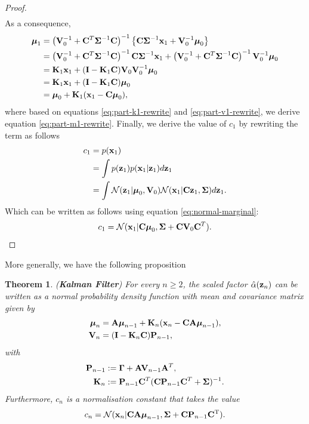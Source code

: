 \documentclass[12pt, oneside]{book}
\numberwithin{equation}{section}
\newcommand{\x}{{\bf x}}
\newcommand{\z}{{\bf z}}
\newcommand{\N}{\mathcal{N}}
\newtheorem{theorem}{Theorem}[section]
\begin{document}
{\begin{proof}
\begin{align}
	\end{align}
	As a consequence,
	\begin{align}
		\boldsymbol{\mu}_1 &= \left({\bf V}_0^{-1} + {\bf C}^T\boldsymbol{\Sigma}^{-1} {\bf C}\right)^{-1} \left\{{\bf C}\boldsymbol\Sigma^{-1}\x_1 + {\bf V}_0^{-1}\boldsymbol\mu_0\right\}\\
		&= \left({\bf V}_0^{-1} + {\bf C}^T\boldsymbol{\Sigma}^{-1} {\bf C}\right)^{-1} {\bf C}\boldsymbol\Sigma^{-1}\x_1 + \left({\bf V}_0^{-1} + {\bf C}^T\boldsymbol{\Sigma}^{-1} {\bf C}\right)^{-1} {\bf V}_0^{-1}\boldsymbol\mu_0\\
		&= {\bf K}_1\x_1 + ({\bf I} - {\bf K}_1{\bf C}){\bf V}_0 {\bf V}_0^{-1}\boldsymbol\mu_0 \label{eq:part-m1-rewrite}\\
		&= {\bf K}_1\x_1 + ({\bf I} - {\bf K}_1{\bf C})\boldsymbol\mu_0 \\
		&= \boldsymbol{\mu}_0 + {\bf K}_1(\x_1 -{\bf C}\boldsymbol\mu_0),
	\end{align}
	where based on equations \eqref{eq:part-k1-rewrite} and \eqref{eq:part-v1-rewrite}, we derive equation \eqref{eq:part-m1-rewrite}.
	Finally, we derive the value of $c_1$ by rewriting the term as follows
	\begin{align}
		c_1 &= p(\x_1)\\
			&= \int p(\z_1) p (\x_1 \vert \z_1) d\z_1\\
			&= \int \N(\z_1\vert \boldsymbol\mu_0, {\bf V}_0) \N(\x_1 \vert {\bf C}\z_1, \boldsymbol\Sigma) d\z_1.
	\end{align}
	Which can be written as follows using equation \eqref{eq:normal-marginal}:
	\begin{equation}
		c_1 = \N(\x_1 \vert {\bf C}\boldsymbol\mu_0, \boldsymbol\Sigma + {\bf C}{\bf V}_0 {\bf C}^T).
	\end{equation}
\end{proof}

More generally, we have the following proposition

\begin{theorem} \label{theorem:kalman-filter}
	(\textbf{Kalman Filter}) For every $n \geq 2$, the scaled factor $\hat\alpha(\z_n)$ can be written as a normal probability density function with mean and covariance matrix given by
	\begin{align}
		\boldsymbol{\mu}_n &= {\bf A}\boldsymbol{\mu}_{n-1} + {\bf K}_n(\x_n -{\bf C}{\bf A}\boldsymbol\mu_{n-1}),\\
		{\bf V}_n &=  ({\bf I} - {\bf K}_n{\bf C}){\bf P}_{n-1}, \label{eq:Vn-Kalman-filter}
	\end{align}	
	with
	\begin{align}
		{\bf P}_{n-1} &:= \boldsymbol{\Gamma} + {\bf A}{\bf V}_{n-1}{\bf A}^T,\\
		{\bf K}_n &:= {\bf P}_{n-1}{\bf C}^T({\bf C} {\bf P}_{n-1}{\bf C}^T + \boldsymbol\Sigma)^{-1}.
	\end{align}
	Furthermore, $c_n$ is a normalisation constant that takes the value
	\begin{equation}
		c_n = \N(\x_n \vert {\bf CA}\boldsymbol\mu_{n-1}, \boldsymbol\Sigma + {\bf C P}_{n-1}{\bf C}^\text{T}).
	\end{equation}
\end{theorem}

}
\end{document}

